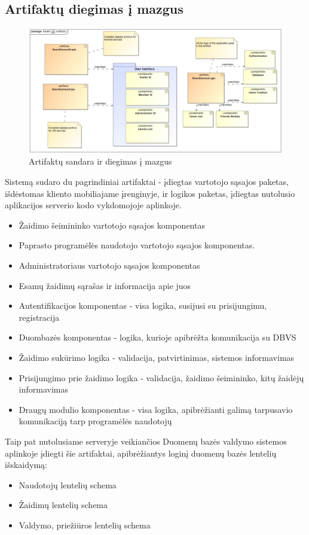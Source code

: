 \documentclass{VUMIFPSkursinis}
\begin{document}
	\subsection{Artifaktų diegimas į mazgus}
				\begin{figure}[H]
				\centering
				\includegraphics[scale=0.4]{img/Artifacts}
				\caption{Artifaktų sandara ir diegimas į mazgus}
				\label{img:Artifacts}
			\end{figure}
			Sistemą sudaro du pagrindiniai artifaktai - įdiegtas vartotojo sąsajos 				paketas, išdėstomas kliento mobiliajame įrenginyje, ir logikos paketas, 			įdiegtas nutolusio aplikacijos serverio kodo vykdomojoje aplinkoje. 
  				\begin{itemize}
					\item Žaidimo šeimininko vartotojo sąsajos komponentas
					\item Paprasto programėlės naudotojo vartotojo sąsajos komponentas.
					\item Administratoriaus vartotojo sąsajos komponentas
					\item Esamų žaidimų sąrašas ir informacija apie juos
				\end{itemize}
  				\begin{itemize}
					\item Autentifikacijos komponentas - visa logika, susijusi 						su prisijungimu, registracija 
					\item Duombazės komponentas - logika, kurioje apibrėžta 					komunikacija su DBVS
					\item Žaidimo sukūrimo logika - validacija, patvirtinimas, 
					sistemos informavimas
					\item Prisijungimo prie žaidimo logika - validacija, 						žaidimo šeimininko, kitų žaidėjų informavimas 
					\item Draugų modulio komponentas - visa logika, 					apibrėžianti galimą tarpusavio komunikaciją tarp 						programėlės naudotojų
				\end{itemize}
			Taip pat nutolusiame serveryje veikiančios Duomenų bazės valdymo 				sistemos aplinkoje įdiegti šie artifaktai, apibrėžiantys loginį 			duomenų bazės lentelių išskaidymą:
  				\begin{itemize}
					\item Naudotojų lentelių schema
					\item Žaidimų lentelių schema
					\item Valdymo, priežiūros lentelių schema
				\end{itemize}
\end{document}
